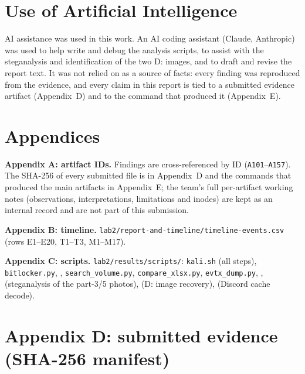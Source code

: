 \documentclass[11pt,a4paper,final,oneside]{article}
\begin{document}
\section{Use of Artificial Intelligence}
\label{sec:ai}

AI assistance was used in this work. An AI coding assistant (Claude, Anthropic) was used to help write and debug the analysis scripts, to assist with the steganalysis and identification of the two D: images, and to draft and revise the report text. It was not relied on as a source of facts: every finding was reproduced from the evidence, and every claim in this report is tied to a submitted evidence artifact (Appendix~D) and to the command that produced it (Appendix~E).

\section{Appendices}
\label{sec:appendices}

\textbf{Appendix A: artifact IDs.} Findings are cross-referenced by ID (\texttt{A101}--\texttt{A157}). The SHA-256 of every submitted file is in Appendix~D and the commands that produced the main artifacts in Appendix~E; the team's full per-artifact working notes (observations, interpretations, limitations and inodes) are kept as an internal record and are not part of this submission.

\textbf{Appendix B: timeline.} \texttt{lab2/report-and-timeline/timeline-events.csv} (rows E1--E20, T1--T3, M1--M17).

\textbf{Appendix C: scripts.} \texttt{lab2/results/scripts/}: \texttt{kali.sh} (all steps), \texttt{bitlocker.py}, \texttt{}, \texttt{search\_volume.py}, \texttt{compare\_xlsx.py}, \texttt{evtx\_dump.py}, \texttt{}, \texttt{} (steganalysis of the part-3/5 photos), \texttt{} (D: image recovery), \texttt{} (Discord cache decode).

\clearpage
\section*{Appendix D: submitted evidence (SHA-256 manifest)}
\end{document}
